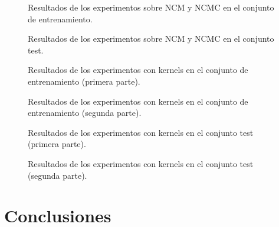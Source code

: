 \begin{figure}[h]
\resizebox{\textwidth}{!}{%
    
}
\caption{Resultados de los experimentos sobre NCM y NCMC en el conjunto de entrenamiento.}
\end{figure}

\begin{figure}[h]
\resizebox{\textwidth}{!}{%
    
}
\caption{Resultados de los experimentos sobre NCM y NCMC en el conjunto test.}
\end{figure}

\begin{figure}[h]
\resizebox{\textwidth}{!}{%
    
}
\caption{Resultados de los experimentos con kernels en el conjunto de entrenamiento (primera parte).}
\end{figure}

\begin{figure}[h]
\resizebox{\textwidth}{!}{%
    
}
\caption{Resultados de los experimentos con kernels en el conjunto de entrenamiento (segunda parte).}
\end{figure}


\begin{figure}[h]
\resizebox{\textwidth}{!}{%
    
}
\caption{Resultados de los experimentos con kernels en el conjunto test (primera parte).}
\end{figure}

\begin{figure}[h]
\resizebox{\textwidth}{!}{%
    
}
\caption{Resultados de los experimentos con kernels en el conjunto test (segunda parte).}
\end{figure}

\section{Conclusiones}

